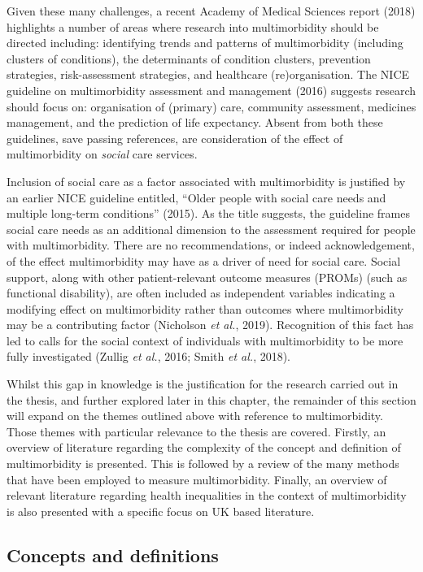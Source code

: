 \documentclass[12pt,a4paper,oneside,table]{report}
\begin{document}
Given these many challenges, a recent Academy of Medical Sciences report
(2018) highlights a number of areas where research into multimorbidity
should be directed including: identifying trends and patterns of
multimorbidity (including clusters of conditions), the determinants of
condition clusters, prevention strategies, risk-assessment strategies,
and healthcare (re)organisation. The NICE guideline on multimorbidity
assessment and management (2016) suggests research should focus on:
organisation of (primary) care, community assessment, medicines
management, and the prediction of life expectancy. Absent from both
these guidelines, save passing references, are consideration of the
effect of multimorbidity on \emph{social} care services.

Inclusion of social care as a factor associated with multimorbidity is
justified by an earlier NICE guideline entitled, ``Older people with
social care needs and multiple long-term conditions'' (2015). As the
title suggests, the guideline frames social care needs as an additional
dimension to the assessment required for people with multimorbidity.
There are no recommendations, or indeed acknowledgement, of the effect
multimorbidity may have as a driver of need for social care. Social
support, along with other patient-relevant outcome measures (PROMs)
(such as functional disability), are often included as independent
variables indicating a modifying effect on multimorbidity rather than
outcomes where multimorbidity may be a contributing factor (Nicholson
\emph{et al.}, 2019). Recognition of this fact has led to calls for the
social context of individuals with multimorbidity to be more fully
investigated (Zullig \emph{et al.}, 2016; Smith \emph{et al.}, 2018).

Whilst this gap in knowledge is the justification for the research
carried out in the thesis, and further explored later in this chapter,
the remainder of this section will expand on the themes outlined above
with reference to multimorbidity. Those themes with particular relevance
to the thesis are covered. Firstly, an overview of literature regarding
the complexity of the concept and definition of multimorbidity is
presented. This is followed by a review of the many methods that have
been employed to measure multimorbidity. Finally, an overview of
relevant literature regarding health inequalities in the context of
multimorbidity is also presented with a specific focus on UK based
literature.

\subsection{Concepts and definitions}\label{subsec:mm-defs}
\end{document}
